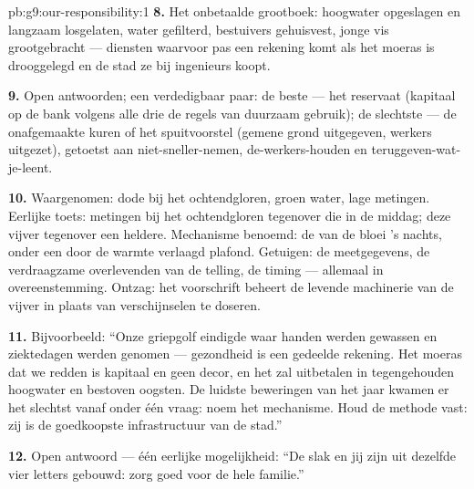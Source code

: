 \begin{solution}{pb:g9:our-responsibility:1}
\textbf{8.} Het onbetaalde grootboek: hoogwater opgeslagen en
langzaam losgelaten, water gefilterd, bestuivers gehuisvest, jonge
vis grootgebracht --- diensten waarvoor pas een rekening komt als
het moeras is drooggelegd en de stad ze bij ingenieurs koopt.

\textbf{9.} Open antwoorden; een verdedigbaar paar: de beste --- het
reservaat (kapitaal op de bank volgens alle drie de regels van
duurzaam gebruik); de slechtste --- de onafgemaakte kuren of het
spuitvoorstel (gemene grond uitgegeven, werkers uitgezet), getoetst
aan niet-sneller-nemen, de-werkers-houden en
teruggeven-wat-je-leent.

\textbf{10.} Waargenomen: dode  bij het ochtendgloren, groen
water, lage metingen. Eerlijke toets: metingen bij het
ochtendgloren tegenover die in de middag; deze vijver tegenover een
heldere. Mechanisme benoemd: de  van de bloei 's nachts,
onder een door de warmte verlaagd plafond. Getuigen: de meetgegevens,
de verdraagzame overlevenden van de telling, de timing --- allemaal
in overeenstemming. Ontzag: het voorschrift beheert de levende
machinerie van de vijver in plaats van verschijnselen te doseren.

\textbf{11.} Bijvoorbeeld: ``Onze griepgolf eindigde waar handen
werden gewassen en ziektedagen werden genomen --- gezondheid is een
gedeelde rekening. Het moeras dat we redden is kapitaal en geen
decor, en het zal uitbetalen in tegengehouden hoogwater en bestoven
oogsten. De luidste beweringen van het jaar kwamen er het slechtst
vanaf onder één vraag: noem het mechanisme. Houd de methode vast:
zij is de goedkoopste infrastructuur van de stad.''

\textbf{12.} Open antwoord --- één eerlijke mogelijkheid: ``De slak
en jij zijn uit dezelfde vier letters gebouwd: zorg goed voor de
hele familie.''
\end{solution}
